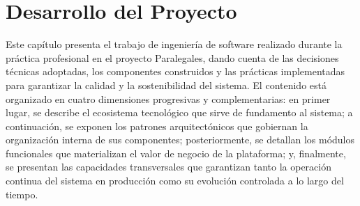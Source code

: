 \section{Desarrollo del Proyecto}

Este capítulo presenta el trabajo de ingeniería de software realizado durante la práctica profesional en el proyecto Paralegales, dando cuenta de las decisiones técnicas adoptadas, los componentes construidos y las prácticas implementadas para garantizar la calidad y la sostenibilidad del sistema. El contenido está organizado en cuatro dimensiones progresivas y complementarias: en primer lugar, se describe el ecosistema tecnológico que sirve de fundamento al sistema; a continuación, se exponen los patrones arquitectónicos que gobiernan la organización interna de sus componentes; posteriormente, se detallan los módulos funcionales que materializan el valor de negocio de la plataforma; y, finalmente, se presentan las capacidades transversales que garantizan tanto la operación continua del sistema en producción como su evolución controlada a lo largo del tiempo.









